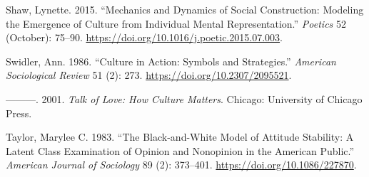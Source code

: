 \documentclass[12pt,]{article}
\begin{document}
\leavevmode\hypertarget{ref-shaw2015}{}%
Shaw, Lynette. 2015. ``Mechanics and Dynamics of Social Construction: Modeling the Emergence of Culture from Individual Mental Representation.'' \emph{Poetics} 52 (October): 75--90. \url{https://doi.org/10.1016/j.poetic.2015.07.003}.

\leavevmode\hypertarget{ref-swidler1986}{}%
Swidler, Ann. 1986. ``Culture in Action: Symbols and Strategies.'' \emph{American Sociological Review} 51 (2): 273. \url{https://doi.org/10.2307/2095521}.

\leavevmode\hypertarget{ref-swidler2001}{}%
---------. 2001. \emph{Talk of Love: How Culture Matters}. Chicago: University of Chicago Press.

\leavevmode\hypertarget{ref-taylor1983}{}%
Taylor, Marylee C. 1983. ``The Black-and-White Model of Attitude Stability: A Latent Class Examination of Opinion and Nonopinion in the American Public.'' \emph{American Journal of Sociology} 89 (2): 373--401. \url{https://doi.org/10.1086/227870}.
\end{document}
